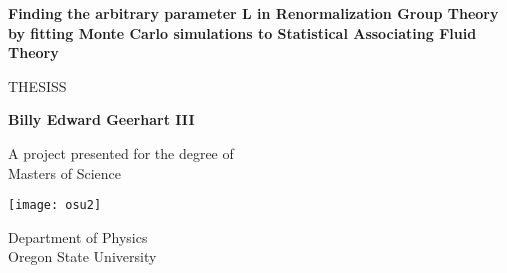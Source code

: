 \begin{titlepage}
	\begin{center}
	\vspace*{1cm}
	
	\Huge
	\textbf{Finding the arbitrary parameter L in Renormalization Group Theory by fitting Monte Carlo simulations to Statistical Associating Fluid Theory}
	
	\vspace{0.5cm}
	\LARGE
	THESISS
	
	\vspace{1.5cm}
	
	\textbf{Billy Edward Geerhart III}
	
	\vfill
	
	A project presented for the degree of\\
	Masters of Science
	
	\vspace{0.8cm}
	
	\texttt{[image: osu2]}
	
	\Large
	Department of Physics\\
	Oregon State University\\
	\date{The date}
	
	\end{center}
\end{titlepage}